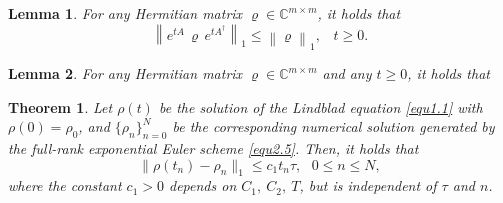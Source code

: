 \documentclass[10pt,a4paper]{amsart}
\newtheorem{lemma}{Lemma}
\newtheorem{theorem}{Theorem}
\begin{document}
\begin{lemma}\label{lem4.1}
   For any Hermitian matrix $\varrho\in \mathbb{C}^{m\times m}$, it holds that
  \begin{equation*}
    \left\|e^{tA} \, \varrho \, e^{tA^{\dag}}\right\|_1\leq \left\|\varrho\right\|_1,~~~\, t\geq0.
  \end{equation*}
\end{lemma}

\begin{lemma}\label{lem4.3}
  For any Hermitian matrix $\varrho\in \mathbb{C}^{m\times m}$ and any $t\geq0$, it holds that
\end{lemma}

\begin{theorem}\label{thm4.1}
  Let $\rho(t)$ be the solution of the Lindblad equation \eqref{equ1.1} with
  $\rho(0)=\rho_0$, and $\{\rho_n\}_{n=0}^N$ be the corresponding numerical solution generated by the full-rank exponential Euler scheme \eqref{equ2.5}. Then, it holds that
  \[\|\rho(t_n)-\rho_n\|_1\leq c_1t_n\tau,~~~0\leq n\leq N,\]
  where the constant $c_1>0$ depends on $C_1,~C_2,~T$, but is independent of $\tau$ and $n$.
\end{theorem}
\end{document}
